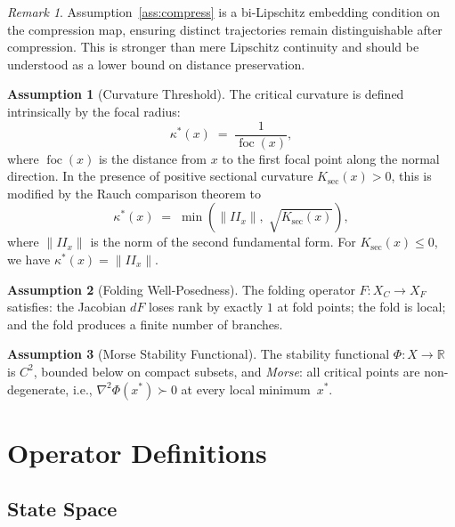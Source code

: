 \documentclass[12pt, oneside]{book}
\theoremstyle{plain}
\theoremstyle{definition}
\newtheorem{assumption}{Assumption}[section]
\theoremstyle{remark}
\newtheorem{remark}{Remark}[section]
\begin{document}
\begin{remark}
Assumption~\ref{ass:compress} is a bi-Lipschitz embedding condition
on the compression map, ensuring distinct trajectories remain
distinguishable after compression. This is stronger than mere Lipschitz
continuity and should be understood as a lower bound on distance
preservation.
\end{remark}

\begin{assumption}[Curvature Threshold]\label{ass:kappa}
The critical curvature is defined intrinsically by the focal radius:
\[
\kappa^*(x) \;=\; \frac{1}{\operatorname{foc}(x)},
\]
where $\operatorname{foc}(x)$ is the distance from $x$ to the first
focal point along the normal direction. In the presence of positive
sectional curvature $K_{\mathrm{sec}}(x) > 0$, this is modified by
the Rauch comparison theorem to
\[
\kappa^*(x) \;=\; \min\!\left(\|II_x\|,\;
  \sqrt{K_{\mathrm{sec}}(x)}\right),
\]
where $\|II_x\|$ is the norm of the second fundamental form.
For $K_{\mathrm{sec}}(x) \le 0$, we have $\kappa^*(x) = \|II_x\|$.
\end{assumption}

\begin{assumption}[Folding Well-Posedness]\label{ass:fold}
The folding operator $F : X_C \to X_F$ satisfies: the Jacobian $dF$
loses rank by exactly $1$ at fold points; the fold is local; and the
fold produces a finite number of branches.
\end{assumption}

\begin{assumption}[Morse Stability Functional]\label{ass:morse}
The stability functional $\Phi : X \to \mathbb{R}$ is $C^2$, bounded
below on compact subsets, and \emph{Morse}: all critical points are
non-degenerate, i.e., $\nabla^2\Phi(x^*) \succ 0$ at every local
minimum~$x^*$.
\end{assumption}

\section{Operator Definitions}\label{sec:operators}

\subsection{State Space}
\end{document}
